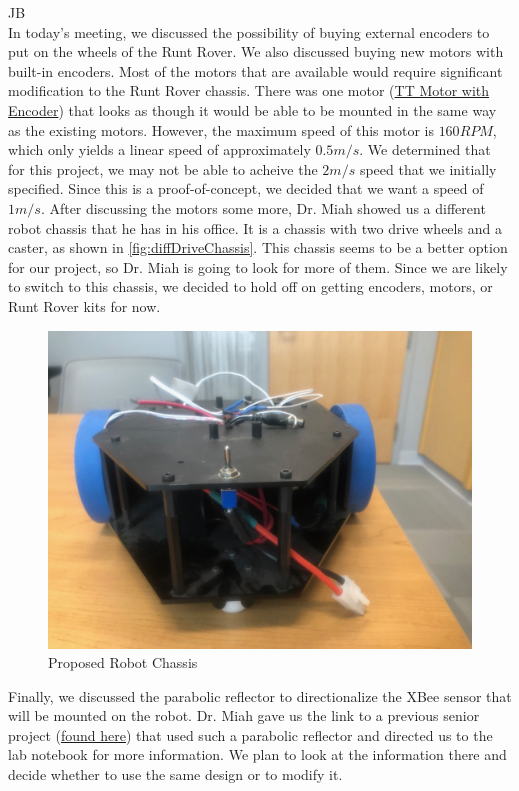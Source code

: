 \documentclass[fontsize=11pt, %
                             paper=letter, %
                             openany, %
                             captions=tableheading,
                             index=totoc,
                             hyperref]{labbook}
\begin{document}
\begin{addmargin}[0cm]{0cm}
JB\\
In today's meeting, we discussed the possibility of buying external encoders to put on the wheels of the Runt Rover. We also discussed buying new motors with built-in encoders. Most of the motors that are available would require significant modification to the Runt Rover chassis. There was one motor (\href{https://www.amazon.com/Motor-Encoder-motor-120-integrated/dp/B07412V7WQ/ref=sr_1_8?dchild=1&keywords=TT+encoder+motor&qid=1603810303&sr=8-8#descriptionAndDetails}{TT Motor with Encoder}) that looks as though it would be able to be mounted in the same way as the existing motors. However, the maximum speed of this motor is $160 RPM$, which only yields a linear speed of approximately $0.5 m/s$. We determined that for this project, we may not be able to acheive the $2 m/s$ speed that we initially specified. Since this is a proof-of-concept, we decided that we want a speed of $1 m/s$. After discussing the motors some more, Dr. Miah showed us a different robot chassis that he has in his office. It is a chassis with two drive wheels and a caster, as shown in \autoref{fig:diffDriveChassis}. This chassis seems to be a better option for our project, so Dr. Miah is going to look for more of them. Since we are likely to switch to this chassis, we decided to hold off on getting encoders, motors, or Runt Rover kits for now.

\begin{figure}[h!]
    \center
    \includegraphics[width=4.5in]{figs/img/diffDriveChassis}
    \caption{Proposed Robot Chassis}
    \label{fig:diffDriveChassis}
\end{figure}

Finally, we discussed the parabolic reflector to directionalize the XBee sensor that will be mounted on the robot. Dr. Miah gave us the link to a previous senior project (\href{http://ee.bradley.edu/projects/proj2017/ekf_slam/Downloads/downloads.html}{found here}) that used such a parabolic reflector and directed us to the lab notebook for more information. We plan to look at the information there and decide whether to use the same design or to modify it.


\end{addmargin}
\end{document}
